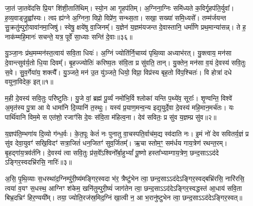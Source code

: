 जा॒तं जा॒तवे॑दसि प्रि॒यꣳ शि॑शी॒ताति॑थिम्। स्यो॒न आ गृ॒हप॑तिम्। अ॒ग्निना॒ग्निः समि॑ध्यते क॒विर्गृ॒हप॑ति॒र्युवा᳚। ह॒व्य॒वाड्जु॒ह्वा᳚स्यः। त्वꣴ ह्य॑ग्ने अ॒ग्निना॒ विप्रो॒ विप्रे॑ण॒ सन्थ्स॒ता। सखा॒ सख्या॑ समि॒ध्यसे᳚। तम्म॑र्जयन्त सु॒क्रतु॑म्पुरो॒यावा॑नमा॒जिषु॑। स्वेषु॒ क्षये॑षु वा॒जिनम्᳚। य॒ज्ञेन॑ य॒ज्ञम॑यजन्त दे॒वास्तानि॒ धर्मा॑णि प्रथ॒मान्या॑सन्न्। ते ह॒ नाक॑म्महि॒मानः॑ सचन्ते॒ यत्र॒ पूर्वे॑ सा॒ध्याः सन्ति॑ दे॒वाः॥३६॥


{\anuvakamend[{वोढ॑वे दू॒तस्त्वन्तमु॑ सीद॒त्वा यत्र॑ च॒त्वारि॑ च॥11॥}]}

{}

\setcounter{anuvakam}{0}
यु॒ञ्जा॒नः प्र॑थ॒मम्मन॑स्त॒त्वाय॑ सवि॒ता धियः॑। अ॒ग्निं ज्योति॑र्नि॒चाय्य॑ पृथि॒व्या अध्याभ॑रत्। यु॒क्त्वाय॒ मन॑सा दे॒वान्त्सुव॑र्य॒तो धि॒या दिवम्᳚। बृ॒हज्ज्योतिः॑ करिष्य॒तः स॑वि॒ता प्र सु॑वति॒ तान्। यु॒क्तेन॒ मन॑सा व॒यं दे॒वस्य॑ सवि॒तुः स॒वे। सु॒व॒र्गेया॑य॒ शक्त्यै᳚। यु॒ञ्जते॒ मन॑ उ॒त यु॑ञ्जते॒ धियो॒ विप्रा॒ विप्र॑स्य बृह॒तो वि॑प॒श्चितः॑। वि होत्रा॑ दधे वयुना॒विदेक॒ इत्॥१॥

म॒ही दे॒वस्य॑ सवि॒तुः परि॑ष्टुतिः। यु॒जे वां॒ ब्रह्म॑ पू॒र्व्यं नमो॑भि॒र्वि श्लोका॑ यन्ति प॒थ्ये॑व॒ सूराः᳚। शृ॒ण्वन्ति॒ विश्वे॑ अ॒मृत॑स्य पु॒त्रा आ ये धामा॑नि दि॒व्यानि॑ त॒स्थुः। यस्य॑ प्र॒याण॒मन्व॒न्य इद्य॒युर्दे॒वा दे॒वस्य॑ महि॒मान॒मर्च॑तः। यः पार्थि॑वानि विम॒मे स एत॑शो॒ रजाꣳ॑सि दे॒वः स॑वि॒ता म॑हित्व॒ना। देव॑ सवितः॒ प्र सु॑व य॒ज्ञम्प्र सु॑व॥२॥

य॒ज्ञप॑ति॒म्भगा॑य दि॒व्यो ग॑न्ध॒र्वः। के॒त॒पूः केतं॑ नः पुनातु वा॒चस्पति॒र्वाच॑म॒द्य स्व॑दाति नः। इ॒मं नो॑ देव सवितर्य॒ज्ञं प्र सु॑व देवा॒युवꣳ॑ सखि॒विदꣳ॑ सत्रा॒जितं॑ धन॒जितꣳ॑ सुव॒र्जितम्᳚। ऋ॒चा स्तोम॒ꣳ॒ सम॑र्धय गाय॒त्रेण॑ रथन्त॒रम्। बृ॒हद्गा॑य॒त्रव॑र्तनि। दे॒वस्य॑ त्वा सवि॒तुः प्र॑स॒वे᳚\-ऽश्विनो᳚र्बा॒हु\-भ्यां᳚ पू॒ष्णो हस्ता᳚भ्याम्गाय॒त्रेण॒ छन्द॒सा\-ऽ\-ऽद॑दे \-ऽङ्गिर॒स्वदभ्रि॑रसि॒ नारिः॑॥३॥

अ॒सि॒ पृ॒थि॒व्याः स॒धस्था॑द॒ग्निम्पु॑री॒ष्य॑मङ्गिर॒स्वदा भ॑र॒ त्रैष्टु॑भेन त्वा॒ छन्द॒सा\-ऽ\-ऽद॑दे\-ऽङ्गिर॒स्वद्बभ्रि॑रसि॒ नारि॑रसि॒ त्वया॑ व॒यꣳ स॒धस्थ॒ आग्निꣳ श॑केम॒ खनि॑तुम्पुरी॒ष्यं॑ जाग॑तेन त्वा॒ छन्द॒सा\-ऽ\-ऽद॑दे\-ऽङ्गिर॒स्वद्धस्त॑ आ॒धाय॑ सवि॒ता बिभ्र॒दभ्रिꣳ॑ हिर॒ण्ययी᳚म्। तया॒ ज्योति॒रज॑स्र॒मिद॒ग्निं खा॒त्वी न॒ आ भ॒रानु॑ष्टुभेन त्वा॒ छन्द॒सा\-ऽ\-ऽद॑दे\-ऽङ्गिर॒स्वत्॥

